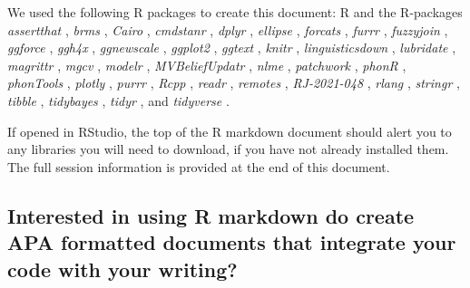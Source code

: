 \documentclass[preprint]{JASA}
\begin{document}
We used the following R packages to create this document: R \citep[Version 4.4.0;][]{R-base} and the R-packages \emph{assertthat} \citep[Version 0.2.1;][]{R-assertthat}, \emph{brms} \citep[Version 2.21.0;][]{R-brms_a, R-brms_b, R-brms_c}, \emph{Cairo} \citep[Version 1.6.2;][]{R-Cairo}, \emph{cmdstanr} \citep[Version 0.7.1;][]{R-cmdstanr}, \emph{dplyr} \citep[Version 1.1.4;][]{R-dplyr}, \emph{ellipse} \citep[Version 0.5.0;][]{R-ellipse}, \emph{forcats} \citep[Version 1.0.0;][]{R-forcats}, \emph{furrr} \citep[Version 0.3.1;][]{R-furrr}, \emph{fuzzyjoin} \citep[Version 0.1.6;][]{R-fuzzyjoin}, \emph{ggforce} \citep[Version 0.4.2;][]{R-ggforce}, \emph{ggh4x} \citep[Version 0.2.8;][]{R-ggh4x}, \emph{ggnewscale} \citep[Version 0.4.10;][]{R-ggnewscale}, \emph{ggplot2} \citep[Version 3.5.1;][]{R-ggplot2}, \emph{ggtext} \citep[Version 0.1.2;][]{R-ggtext}, \emph{knitr} \citep[Version 1.47;][]{R-knitr}, \emph{linguisticsdown} \citep[Version 1.2.0;][]{R-linguisticsdown}, \emph{lubridate} \citep[Version 1.9.3;][]{R-lubridate}, \emph{magrittr} \citep[Version 2.0.3;][]{R-magrittr}, \emph{mgcv} \citep[Version 1.9.1;][]{R-mgcv_a, R-mgcv_b, R-mgcv_c, R-mgcv_d}, \emph{modelr} \citep[Version 0.1.11;][]{R-modelr}, \emph{MVBeliefUpdatr} \citep[Version 0.0.1.10;][]{R-MVBeliefUpdatr}, \emph{nlme} \citep[Version 3.1.164;][]{R-nlme}, \emph{patchwork} \citep[Version 1.2.0;][]{R-patchwork}, \emph{phonR} \citep[Version 1.0.7;][]{R-phonR}, \emph{phonTools} \citep[Version 0.2.2.2;][]{R-phonTools}, \emph{plotly} \citep[Version 4.10.4;][]{R-plotly}, \emph{purrr} \citep[Version 1.0.2;][]{R-purrr}, \emph{Rcpp} \citep[Version 1.0.12;][]{R-Rcpp}, \emph{readr} \citep[Version 2.1.5;][]{R-readr}, \emph{remotes} \citep[Version 2.5.0;][]{R-remotes}, \emph{RJ-2021-048} \citep{R-RJ-2021-048}, \emph{rlang} \citep[Version 1.1.4;][]{R-rlang}, \emph{stringr} \citep[Version 1.5.1;][]{R-stringr}, \emph{tibble} \citep[Version 3.2.1;][]{R-tibble}, \emph{tidybayes} \citep[Version 3.0.6;][]{R-tidybayes}, \emph{tidyr} \citep[Version 1.3.1;][]{R-tidyr}, and \emph{tidyverse} \citep[Version 2.0.0;][]{R-tidyverse}.

If opened in RStudio, the top of the R markdown document should alert you to any libraries you will need to download, if you have not already installed them. The full session information is provided at the end of this document.

\subsection{Interested in using R markdown do create APA formatted documents that integrate your code with your writing?}\label{interested-in-using-r-markdown-do-create-apa-formatted-documents-that-integrate-your-code-with-your-writing}
\end{document}
